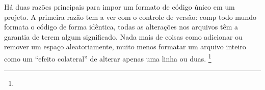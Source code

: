 \begin{citacao}
    Há duas razões principais para impor um formato de código único em um projeto.
    A primeira razão tem a ver com o controle de versão:
    comp todo mundo formata o código de forma idêntica,
    todas as alterações nos arquivos têm a garantia de terem algum significado.
    Nada mais de coisas como adicionar ou remover um espaço aleatoriamente,
    muito menos formatar um arquivo inteiro como um ``efeito
    colateral'' de alterar apenas uma linha ou duas.
    \cite[tradução nossa]{Geukens} \footnote{}
\end{citacao}

